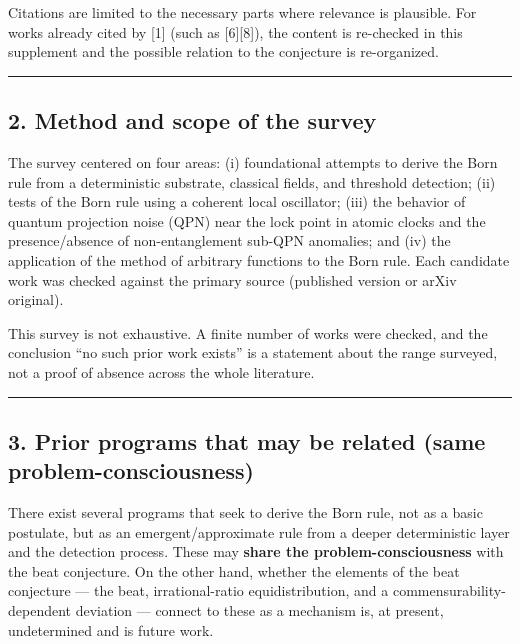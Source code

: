 \documentclass[
]{ltjsarticle}
\begin{document}
Citations are limited to the necessary parts where relevance is
plausible. For works already cited by {[}1{]} (such as {[}6{]}{[}8{]}),
the content is re-checked in this supplement and the possible relation
to the conjecture is re-organized.

\begin{center}\rule{0.5\linewidth}{0.5pt}\end{center}

\subsection{2. Method and scope of the
survey}\label{method-and-scope-of-the-survey}

The survey centered on four areas: (i) foundational attempts to derive
the Born rule from a deterministic substrate, classical fields, and
threshold detection; (ii) tests of the Born rule using a coherent local
oscillator; (iii) the behavior of quantum projection noise (QPN) near
the lock point in atomic clocks and the presence/absence of
non-entanglement sub-QPN anomalies; and (iv) the application of the
method of arbitrary functions to the Born rule. Each candidate work was
checked against the primary source (published version or arXiv
original).

This survey is not exhaustive. A finite number of works were checked,
and the conclusion ``no such prior work exists'' is a statement about
the range surveyed, not a proof of absence across the whole literature.

\begin{center}\rule{0.5\linewidth}{0.5pt}\end{center}

\subsection{3. Prior programs that may be related (same
problem-consciousness)}\label{prior-programs-that-may-be-related-same-problem-consciousness}

There exist several programs that seek to derive the Born rule, not as a
basic postulate, but as an emergent/approximate rule from a deeper
deterministic layer and the detection process. These may \textbf{share
the problem-consciousness} with the beat conjecture. On the other hand,
whether the elements of the beat conjecture --- the beat,
irrational-ratio equidistribution, and a commensurability-dependent
deviation --- connect to these as a mechanism is, at present,
undetermined and is future work.
\end{document}
